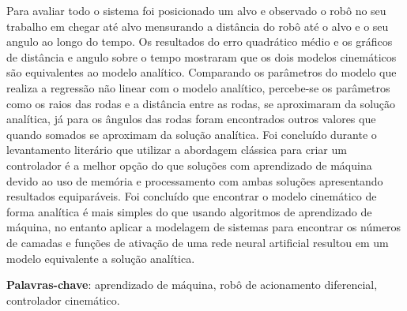 Para avaliar todo o sistema foi posicionado um alvo e observado o robô no 
seu trabalho em chegar até alvo mensurando a distância do robô até o
alvo e o seu angulo ao longo do tempo. Os resultados do erro quadrático médio e os
gráficos de distância e angulo sobre o tempo 
mostraram que os dois modelos cinemáticos são equivalentes ao modelo
analítico. Comparando os parâmetros do modelo que realiza a
regressão não linear com o modelo analítico,
percebe-se os parâmetros como os raios das rodas e a distância entre as rodas,
se aproximaram da solução analítica, já para os ângulos das rodas foram
encontrados outros valores que quando somados se aproximam da solução
analítica. Foi concluído durante o levantamento literário que
utilizar a abordagem clássica para criar um controlador é a melhor opção do
que soluções com aprendizado de máquina devido ao uso de memória e
processamento com ambas soluções apresentando resultados equiparáveis.
Foi concluído que encontrar o modelo cinemático de forma analítica é mais
simples do que usando algoritmos de aprendizado
de máquina, no entanto aplicar a modelagem  de sistemas para encontrar
os números de camadas e funções de ativação de uma rede neural artificial
resultou em um modelo equivalente
a solução analítica.




\vspace{1.5ex}

{\bf Palavras-chave}: aprendizado de máquina, robô de acionamento diferencial,
controlador cinemático.

%
%

